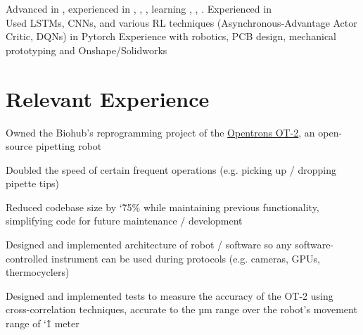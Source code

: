 \documentclass[]{deedy-resume-openfont}
\begin{document}

\begin{minipage}[t]{\textwidth}
   Advanced in , experienced in , , , learning , , . Experienced in \\
  \ifdef{\software} {
     Used LSTMs, CNNs, and various RL techniques (Asynchronous-Advantage Actor Critic, DQNs) in Pytorch
  } {
     Experience with robotics, PCB design, mechanical prototyping and Onshape/Solidworks
  }
\end{minipage}

\vspace{12pt}

\section{Relevant Experience}

\begin{tightemize}
    \item Owned the Biohub's reprogramming project of the \href{https://opentrons.com/ot-2/}{Opentrons OT-2}, an open-source pipetting robot
    \item Doubled the speed of certain frequent operations (e.g. picking up / dropping pipette tips)
    \item Reduced codebase size by \char`\~ 75\% while maintaining previous functionality, simplifying code for future maintenance / development
    \item Designed and implemented architecture of robot / software so any software-controlled instrument can be used during protocols (e.g. cameras, GPUs, thermocyclers)
    \item Designed and implemented tests to measure the accuracy of the OT-2 using cross-correlation techniques, accurate to the µm range over the robot's movement range of \char`\~ 1 meter
\end{tightemize}
\end{document}
